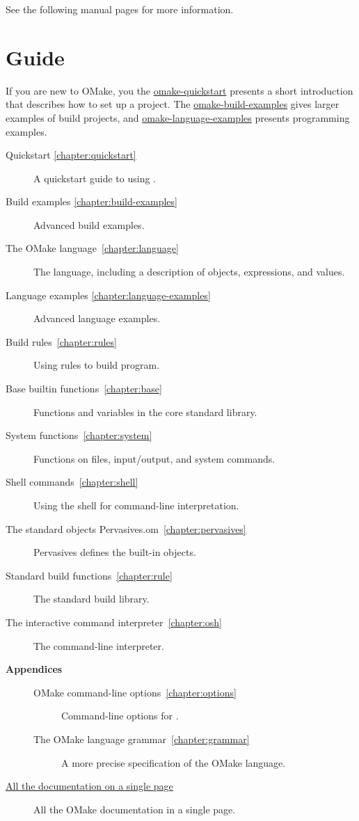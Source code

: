 %
See the following manual pages for more information.

\section{Guide}
\label{section:guide}

If you are new to OMake, you the \href{omake-quickstart.html}{omake-quickstart} presents a short
introduction that describes how to set up a project.  The
\href{omake-build-examples.html}{omake-build-examples} gives larger examples of build projects, and
\href{omake-language-examples.html}{omake-language-examples} presents programming examples.

\begin{description}
\item[Quickstart \ref{chapter:quickstart}]
%
   A quickstart guide to using .
\item[Build examples \ref{chapter:build-examples}]
%
   Advanced build examples.
\item[The OMake language~\ref{chapter:language}]
%
   The  language, including a description of objects, expressions, and values.
\item[Language examples \ref{chapter:language-examples}]
%
   Advanced language examples.
\item[Build rules~\ref{chapter:rules}]
%
   Using  rules to build program.
\item[Base builtin functions~\ref{chapter:base}]
%
   Functions and variables in the core standard library.
\item[System functions~\ref{chapter:system}]
%
   Functions on files, input/output, and system commands.
\item[Shell commands~\ref{chapter:shell}]
%
   Using the  shell for command-line interpretation.
\item[The standard objects Pervasives.om~\ref{chapter:pervasives}]
%
   Pervasives defines the built-in objects.
\item[Standard build functions~\ref{chapter:rule}]
%
   The standard build library.
\item[The interactive command interpreter~\ref{chapter:osh}]
%
   The  command-line interpreter.
\item[\textbf{Appendices}]
\begin{description}
\item[OMake command-line options~\ref{chapter:options}]
%
   Command-line options for .
%
\item[The OMake language grammar~\ref{chapter:grammar}]
%
   A more precise specification of the OMake language.
\end{description}
\item[\href{omake-doc.html}{All the documentation on a single page}]
%
   All the OMake documentation in a single page.
\end{description}

